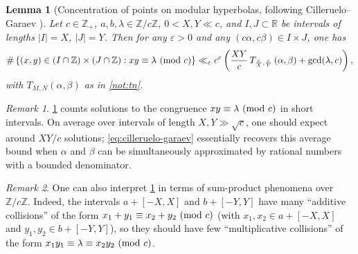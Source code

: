 \documentclass[reqno,11pt]{amsart}
\newtheorem{lemma}[theorem]{Lemma}
\theoremstyle{remark}
\newtheorem*{remark}{Remark}
\numberwithin{equation}{section}
\newcommand{\Z}{\mathbb{Z}}
\newcommand{\R}{\mathbb{R}}
\newcommand{\eps}{\varepsilon}
\renewcommand{\pmod}[1]{\ (\textnormal{mod } #1)}
\begin{document}
\begin{lemma}[Concentration of points on modular hyperbolas, following Cilleruelo--Garaev \cite{cilleruelo2011concentration}] \label{lem:cilleruelo-garaev}
Let $c \in \Z_+$, $a, b, \lambda \in \Z/c\Z$, $0 < X,Y \ll c$, and $I, J \subset \R$ be intervals of lengths $|I| = X$, $|J| = Y$. Then for any $\eps > 0$ and any $(c\alpha, c\beta) \in I \times J$, one has
\begin{equation} \label{eq:cilleruelo-garaev}
    \# \left\{
    (x, y) \in (I \cap \Z) \times (J \cap \Z) : xy \equiv \lambda \pmod{c}
    \right\}
    \ll_\eps 
    c^\eps \left(\frac{XY}{c}\, T_{\frac{c}{X}, \frac{c}{Y}}\left(\alpha, \beta\right) + \gcd(\lambda, c)\right),
\end{equation}
with $T_{M,N}(\alpha, \beta)$ as in \cref{not:tn}.
\end{lemma}

\begin{remark}
    \cref{lem:cilleruelo-garaev} counts solutions to the congruence $xy \equiv \lambda \pmod{c}$ in short intervals. On average over intervals of length $X, Y\gg \sqrt{c}$, one should expect around $XY/c$ solutions; \cref{eq:cilleruelo-garaev} essentially recovers this average bound when $\alpha$ and $\beta$ can be simultaneously approximated by rational numbers with a bounded denominator.
\end{remark}

\begin{remark}
    One can also interpret \cref{lem:cilleruelo-garaev} in terms of sum-product phenomena over $\Z/c\Z$. Indeed, the intervals $a + [-X, X]$ and $b + [-Y, Y]$ have many ``additive collisions'' of the form $x_1 + y_1 \equiv x_2 + y_2 \pmod{c}$ (with $x_1, x_2 \in a + [-X, X]$ and $y_1, y_2 \in b + [-Y, Y]$), so they should have few ``multiplicative collisions'' of the form $x_1 y_1 \equiv \lambda \equiv x_2 y_2  \pmod{c}$.
\end{remark}
\end{document}

